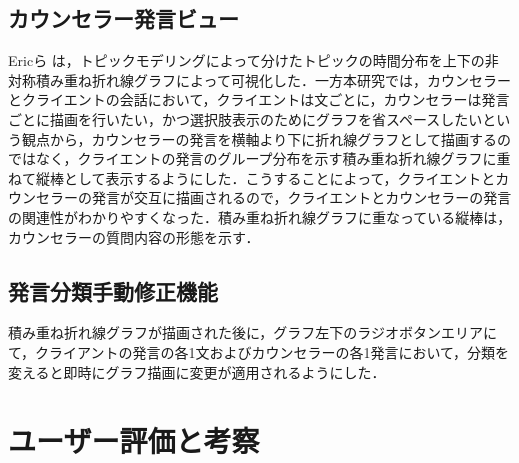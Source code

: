 \documentclass[shuuron]{kuee}
\begin{document}




\subsection{カウンセラー発言ビュー}

Ericら
は，トピックモデリングによって分けたトピックの時間分布を上下の非対称積み重ね折れ線グラフによって可視化した．一方本研究では，カウンセラーとクライエントの会話において，クライエントは文ごとに，カウンセラーは発言ごとに描画を行いたい，かつ選択肢表示のためにグラフを省スペースしたいという観点から，カウンセラーの発言を横軸より下に折れ線グラフとして描画するのではなく，クライエントの発言のグループ分布を示す積み重ね折れ線グラフに重ねて縦棒として表示するようにした．こうすることによって，クライエントとカウンセラーの発言が交互に描画されるので，クライエントとカウンセラーの発言の関連性がわかりやすくなった．積み重ね折れ線グラフに重なっている縦棒は，カウンセラーの質問内容の形態を示す．


\subsection{発言分類手動修正機能}
積み重ね折れ線グラフが描画された後に，グラフ左下のラジオボタンエリアにて，クライアントの発言の各1文およびカウンセラーの各1発言において，分類を変えると即時にグラフ描画に変更が適用されるようにした．










\section{ユーザー評価と考察}
\end{document}
